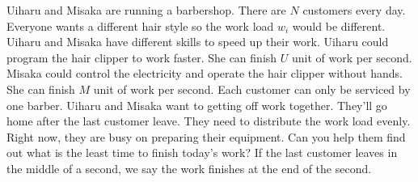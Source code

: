 Uiharu and Misaka are running a barbershop. 
There are $N$ customers every day. 
Everyone wants a different hair style so the work load $w_i$ would be different.
Uiharu and Misaka have different skills to speed up their work. 
Uiharu could program the hair clipper to work faster. 
She can finish $U$ unit of work per second. 
Misaka could control the electricity and operate the hair clipper without hands.
She can finish $M$ unit of work per second. 
Each customer can only be serviced by one barber. 
Uiharu and Misaka want to getting off work together. 
They'll go home after the last customer leave. 
They need to distribute the work load evenly. 
Right now, they are busy on preparing their equipment. 
Can you help them find out what is the least time to finish today's work? 
If the last customer leaves in the middle of a second, 
we say the work finishes at the end of the second.
